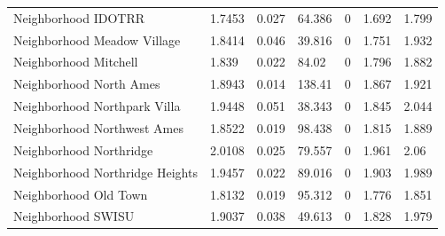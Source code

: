 \documentclass{article}
\begin{document}
\begin{table}[H]
\begin{tabular}{lllllll}
		Neighborhood IDOTRR              & 1.7453                    & 0.027                        & 64.386                 & 0                                       & 1.692                         & 1.799                         \\
		Neighborhood Meadow Village      & 1.8414                    & 0.046                        & 39.816                 & 0                                       & 1.751                         & 1.932                         \\
		Neighborhood Mitchell            & 1.839                     & 0.022                        & 84.02                  & 0                                       & 1.796                         & 1.882                         \\
		Neighborhood North Ames          & 1.8943                    & 0.014                        & 138.41                 & 0                                       & 1.867                         & 1.921                         \\
		Neighborhood  Northpark Villa    & 1.9448                    & 0.051                        & 38.343                 & 0                                       & 1.845                         & 2.044                         \\
		Neighborhood Northwest Ames      & 1.8522                    & 0.019                        & 98.438                 & 0                                       & 1.815                         & 1.889                         \\
		Neighborhood Northridge          & 2.0108                    & 0.025                        & 79.557                 & 0                                       & 1.961                         & 2.06                          \\
		Neighborhood Northridge Heights  & 1.9457                    & 0.022                        & 89.016                 & 0                                       & 1.903                         & 1.989                         \\
		Neighborhood Old Town            & 1.8132                    & 0.019                        & 95.312                 & 0                                       & 1.776                         & 1.851                         \\
		Neighborhood SWISU               & 1.9037                    & 0.038                        & 49.613                 & 0                                       & 1.828                         & 1.979                         \\

\end{tabular}
\end{table}
\end{document}

